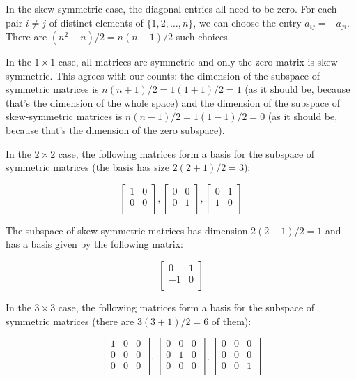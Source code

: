 \documentclass[10pt]{amsart}
\begin{document}
\begin{enumerate}
  In the skew-symmetric case, the diagonal entries all need to be
  zero. For each pair $i \ne j$ of distinct elements of $\{
  1,2,\dots,n\}$, we can choose the entry $a_{ij} = -a_{ji}$. There
  are $(n^2 - n)/2 = n(n - 1)/2$ such choices.

  In the $1 \times 1$ case, all matrices are symmetric and only the
  zero matrix is skew-symmetric. This agrees with our counts: the
  dimension of the subspace of symmetric matrices is $n(n+1)/2 = 1(1 +
  1)/2 = 1$ (as it should be, because that's the dimension of the
  whole space) and the dimension of the subspace of skew-symmetric
  matrices is $n(n-1)/2 = 1(1-1)/2 = 0$ (as it should be, because
  that's the dimension of the zero subspace).

  In the $2 \times 2$ case, the following matrices form a basis for
  the subspace of symmetric matrices (the basis has size $2(2+1)/2 =
  3$):

  $$\left[ \begin{matrix} 1 & 0 \\ 0 & 0 \\\end{matrix}\right], \left[\begin{matrix} 0 & 0 \\ 0 & 1 \\\end{matrix}\right], \left[\begin{matrix} 0 & 1 \\ 1 & 0 \\\end{matrix}\right]$$

  The subspace of skew-symmetric matrices has dimension $2(2-1)/2 = 1$
  and has a basis given by the following matrix:

  $$\left[ \begin{matrix} 0 & 1 \\ -1 & 0 \\\end{matrix}\right]$$

  In the $3 \times 3$ case, the following matrices form a basis for
  the subspace of symmetric matrices (there are $3(3 + 1)/2 = 6$ of them):

  $$\left[ \begin{matrix} 1 & 0 & 0 \\ 0 & 0 & 0 \\ 0 & 0 & 0 \\\end{matrix}\right], \left[ \begin{matrix} 0 & 0 & 0 \\ 0 & 1 & 0 \\ 0 & 0 & 0 \\\end{matrix}\right], \left[ \begin{matrix} 0 & 0 & 0 \\ 0 & 0 & 0 \\ 0 & 0 & 1 \\\end{matrix}\right]$$


\end{enumerate}
\end{document}
